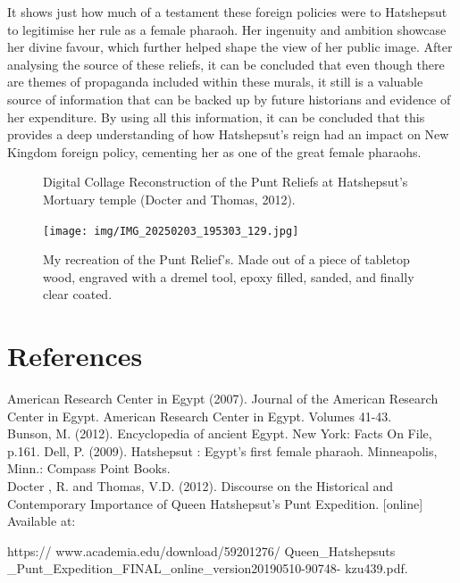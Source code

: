 \documentclass[12pt, letterpaper]{article}
\begin{document}
It shows just how much of a testament these foreign policies were to Hatshepsut to legitimise her rule as a female pharaoh. Her ingenuity and ambition showcase her divine favour, which further helped shape the view of her public image. After analysing the source of these reliefs, it can be concluded that even though there are themes of propaganda included within these murals, it still is a valuable source of information that can be backed up by future historians and evidence of her expenditure. By using all this information, it can be concluded that this provides a deep understanding of how Hatshepsut's reign had an impact on New Kingdom foreign policy, cementing her as one of the great female pharaohs.


\pagebreak

\begin{figure}
    \centering
    \caption{Digital Collage Reconstruction of the Punt Reliefs at Hatshepsut's Mortuary temple (Docter and Thomas, 2012).}
    \label{fig:enter-label}
\end{figure}

\begin{figure}
    \centering
    \texttt{[image: img/IMG\_20250203\_195303\_129.jpg]}
    \caption{My recreation of the Punt Relief's. Made out of a piece of tabletop wood, engraved with a dremel tool, epoxy filled, sanded, and finally clear coated.}
    \label{fig:enter-label}
\end{figure}
\newpage

\section*{\huge\textbf{References}}

American Research Center in Egypt (2007). Journal of the American Research Center in
Egypt. American Research Center in Egypt. Volumes 41-43. \\

Bunson, M. (2012). Encyclopedia of ancient Egypt. New York: Facts On File, p.161.
Dell, P. (2009). Hatshepsut : Egypt’s first female pharaoh. Minneapolis, Minn.: Compass Point Books. \\

Docter , R. and Thomas, V.D. (2012). Discourse on the Historical and Contemporary
Importance of Queen Hatshepsut’s Punt Expedition. [online] Available at: 

https://
www.academia.edu/download/59201276/
Queen\_Hatshepsuts\\ \_Punt\_Expedition\_FINAL\_online\_version20190510-90748-
kzu439.pdf. \\
\end{document}
